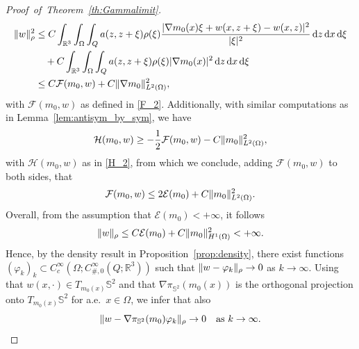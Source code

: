 \documentclass[reqno,11pt]{amsart}
\numberwithin{equation}{section}
\theoremstyle{thmlemcorr}
\numberwithin{theorem}{section}
\theoremstyle{thmlemcorr*}
\theoremstyle{defi}
\theoremstyle{remexample}
\theoremstyle{ass}
\newcommand{\R}{\mathbb{R}}
\renewcommand{\S}{\mathbb{S}}
\newcommand{\dd}{\,\mathrm{d}}
\DeclarePairedDelimiter{\abs}{\lvert}{\rvert}
\DeclarePairedDelimiter{\norm}{\lVert}{\rVert}
\DeclarePairedDelimiter{\inner}{\langle}{\rangle}
\newcommand{\1}{\mathds{1}}
\newcommand{\Om}{\Omega}
\newcommand{\dl}{\,\mathrm{d}}
\newcommand{\seq}[1]{(#1_k)_{k}}
\begin{document}
\begin{proof}[Proof~of~Theorem~\ref{th:Gammalimit}]
\begin{align*}
    \norm{w}_\rho^2
    &\le 
    C\int_{\R^3}\int_\Om\int_Qa(z,z+\xi)\rho(\xi)\frac{|\nabla m_0(x)\xi +w(x,z+\xi)-w(x,z)|^2}{|\xi|^2}{\dd z \dd x \dd \xi}\\
    &\quad+ C\int_{\R^3}\int_\Om\int_Qa(z,z+\xi)\rho(\xi)|\nabla m_0(x)|^2{\dd z \dd x \dd \xi}\\
    &\le C \mathcal{F}(m_0,w) + C\norm{\nabla m_0}^2_{L^2(\Om)},
\end{align*}
with $\mathcal{F}(m_0,w)$ as defined in \eqref{F_2}. 
Additionally, with similar computations as in Lemma~\ref{lem:antisym_by_sym}, we have
\begin{align*}
    \mathcal{H}(m_0,w)
    \ge -\frac{1}{2} \mathcal{F}(m_0,w) - C\norm{m_0}^2_{L^2(\Om)},
\end{align*}
with $ \mathcal{H}(m_0,w)$ as in \eqref{H_2}, from which we conclude, adding \(\mathcal{F}(m_0,w)\) to both sides, that
\begin{align*}
    \mathcal{F}(m_0,w)
    \le 2\mathcal{E}(m_0) + C\norm{m_0}^2_{L^2(\Om)}.
\end{align*}
Overall, from the assumption that \(\mathcal{E}(m_0)<+ \infty\), it follows 
\begin{equation*}
    \norm{w}_\rho
    \le C\mathcal{E}(m_0) + C\norm{m_0}^2_{H^1(\Om)}
    <+ \infty.
\end{equation*}
Hence, by the density result in Proposition~\ref{prop:density}, there exist functions \(\seq{\varphi}\subset C_c^\infty(\Om; C^\infty_{\#,0}(Q;\R^3))\) such that \(\norm{w-\varphi_k}_\rho\to 0\) as $k \to \infty$. 
Using that $w(x,\cdot) \in T_{m_0(x)}\S^2$ and that \(\nabla \pi_{\S^2}(m_0(x))\) is the orthogonal projection onto \(T_{m_0(x)}{\S^2}\) for a.e.~$x \in \Omega$, we infer that also
\[
 \norm{w-\nabla\pi_{\S^2}(m_0)\varphi_k}_\rho\to 0 \quad \text{as $k \to \infty$}.
\]

\end{proof}
\end{document}
